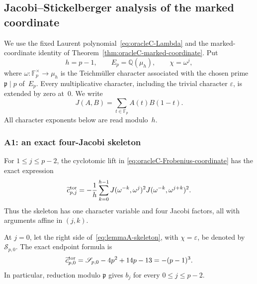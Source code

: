 
\subsection{Jacobi--Stickelberger analysis of the marked coordinate}
\label{ssec:lemmaA-result}

We use the fixed Laurent polynomial~\eqref{eq:oracleC-Lambda} and the
marked-coordinate identity of
Theorem~\ref{thm:oracleC-marked-coordinate}.  Put
\[
 h=p-1,
 \qquad E_p=\mathbb Q(\mu_h),
 \qquad \chi=\omega^j,
\]
where $\omega\colon\mathbb F_p^\times\to\mu_h$ is the Teichm\"uller
character associated with the chosen prime $\mathfrak p\mid p$ of~$E_p$.
Every multiplicative character, including the trivial character
$\varepsilon$, is extended by zero at~$0$.  We write
\[
 J(A,B)=\sum_{t\in\mathbb F_p}A(t)B(1-t).
\]
All character exponents below are read modulo~$h$.

\subsubsection{A1: an exact four-Jacobi skeleton}

\begin{theorem}
\label{thm:lemmaA-skeleton}
For $1\leq j\leq p-2$, the cyclotomic lift in
\eqref{eq:oracleC-Frobenius-coordinate} has the exact expression
\begin{equation}
 \widetilde c_{p,j}^{\rm tor}
 =-\frac1h\sum_{k=0}^{h-1}
 J(\omega^{-k},\omega^j)^2
 J(\omega^{-k},\omega^{j+k})^2.
 \label{eq:lemmaA-skeleton}
\end{equation}
Thus the skeleton has one character variable and four Jacobi factors,
all with arguments affine in $(j,k)$.

At $j=0$, let the right side of~\eqref{eq:lemmaA-skeleton}, with
$\chi=\varepsilon$, be denoted by $\mathscr S_{p,0}$.  The exact endpoint
formula is
\begin{equation}
 \widetilde c_{p,0}^{\rm tor}
 =\mathscr S_{p,0}-4p^2+14p-13
 =-(p-1)^3.
 \label{eq:lemmaA-endpoint}
\end{equation}
In particular, reduction modulo $\mathfrak p$ gives $b_j$ for every
$0\leq j\leq p-2$.
\end{theorem}

